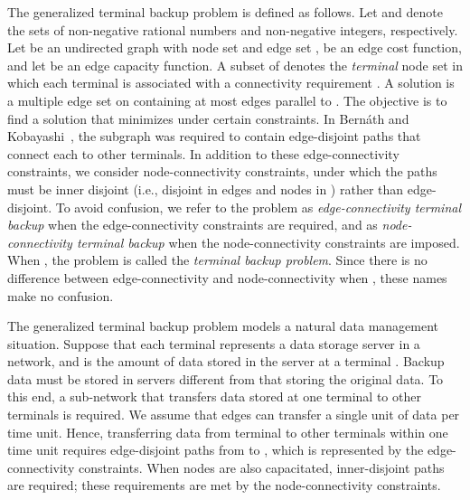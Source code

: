 \documentclass{article}
\begin{document}
The generalized terminal backup problem is defined as follows. 
Let  and  
denote the sets of non-negative rational numbers and non-negative integers, 
respectively. 
Let  be an undirected graph
with node set  and edge set , 
 be an edge cost function,
and let  be an edge capacity function.
A subset  of  denotes the \emph{terminal} node set in which
each terminal  is associated with a connectivity requirement
.
A solution is a multiple edge set on  containing at most  edges parallel 
to . The objective is to find a solution
 that minimizes  under certain constraints.
In Bern{\'a}th and Kobayashi~\cite{Bernath2014}, 
the subgraph  was required to contain  
edge-disjoint paths that connect each  to other terminals.
In addition to these edge-connectivity constraints, we consider
node-connectivity constraints, under which the paths must be 
inner disjoint (i.e., disjoint in edges and nodes in ) rather than edge-disjoint.
To avoid confusion,
we refer to the problem as \emph{edge-connectivity terminal backup} 
when the edge-connectivity constraints are required, and
as \emph{node-connectivity terminal backup}
when the node-connectivity constraints are imposed.
When , the problem is called the \emph{terminal backup problem}.
Since there is no difference between edge-connectivity and node-connectivity
when , these names make no confusion.

The generalized terminal backup problem 
models a natural data management situation. Suppose that each terminal represents a data storage server
in a network, and  is the amount of data stored in the server at a terminal .
Backup data must be stored in servers different from that storing the original data.
To this end, 
a sub-network that transfers data stored at one terminal to other terminals is required. 
We assume that 
edges can transfer a single unit of data per time unit.
Hence, transferring data from terminal  to other terminals within one time unit
requires  edge-disjoint paths from  
to , which is represented by the edge-connectivity constraints. 
When nodes are also capacitated,  
inner-disjoint paths are required; these requirements are met by the node-connectivity
constraints.
\end{document}
